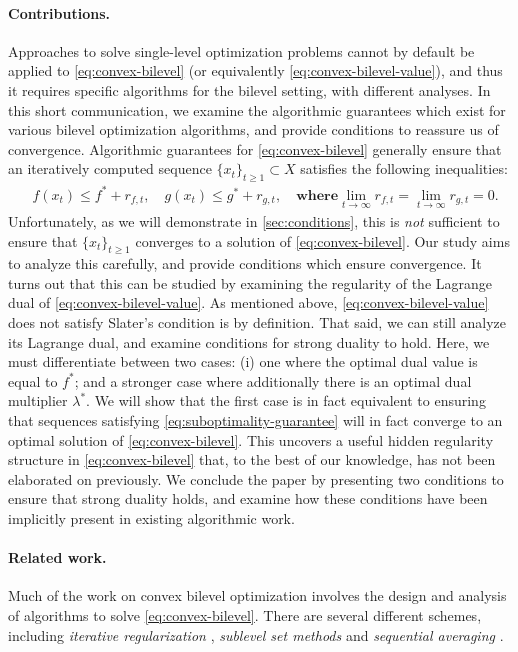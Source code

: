 \documentclass[11pt,oneside]{article}
\theoremstyle{plain}
\theoremstyle{plain}
\theoremstyle{plain}%
\begin{document}
{\paragraph{Contributions.} Approaches to solve single-level optimization problems cannot by default be applied to \cref{eq:convex-bilevel} (or equivalently \cref{eq:convex-bilevel-value}), and thus it requires specific algorithms for the bilevel setting, with different analyses. In this short communication, we examine the algorithmic guarantees which exist for various bilevel optimization algorithms, and provide conditions to reassure us of convergence. Algorithmic guarantees for \cref{eq:convex-bilevel} generally ensure that an iteratively computed sequence $\{x_t\}_{t \geq 1} \subset X$ satisfies the following inequalities:
\begin{align}\label{eq:suboptimality-guarantee}
&f(x_t) \leq f^* + r_{f,t}, \quad g(x_t) \leq g^* + r_{g,t}, \quad \textbf{where} \lim_{t \to \infty} r_{f,t} = \lim_{t \to \infty} r_{g,t} = 0.
\end{align}
Unfortunately, as we will demonstrate in \cref{sec:conditions}, this is \emph{not} sufficient to ensure that $\{x_t\}_{t \geq 1}$ converges to a solution of \cref{eq:convex-bilevel}. Our study aims to analyze this carefully, and provide conditions which ensure convergence. It turns out that this can be studied by examining the regularity of the Lagrange dual of \cref{eq:convex-bilevel-value}. As mentioned above, \cref{eq:convex-bilevel-value} does not satisfy Slater's condition is by definition. That said, we can still analyze its Lagrange dual, and examine conditions for strong duality to hold. Here, we must differentiate between two cases: (i) one where the optimal dual value is equal to $f^*$; and a stronger case where additionally there is an optimal dual multiplier $\lambda^*$. We will show that the first case is in fact equivalent to ensuring that sequences satisfying \cref{eq:suboptimality-guarantee} will in fact converge to an optimal solution of \cref{eq:convex-bilevel}. This uncovers a useful hidden regularity structure in \cref{eq:convex-bilevel} that, to the best of our knowledge, has not been elaborated on previously. We conclude the paper by presenting two conditions to ensure that strong duality holds, and examine how these conditions have been implicitly present in existing algorithmic work.

\paragraph{Related work.} Much of the work on convex bilevel optimization involves the design and analysis of algorithms to solve \cref{eq:convex-bilevel}. There are several different schemes, including \emph{iterative regularization} \citep{Cabot2005,Solodov2006,SolodovMikhail2007,HelouSimões2017,Malitsky2017,DempeEtAl2019,AminiEtAl2019,KaushikYousefian2021,ShenLingqing2023,GiangTranEtAL2024,MerchavEtAl2024,SamadiEtAl2024,ChenEtAl2024,ShternTaiwo2025}, \emph{sublevel set methods} \citep{BeckSabach2014,JiangEtAl2023,CaoEtAl2023,DoronShtern2022,CaoEtAl2024,WangEtAl2024} and \emph{sequential averaging} \citep{SabachEtAl2017,ShehuEtAl2021,MerchavSabach2023}.

}
\end{document}
